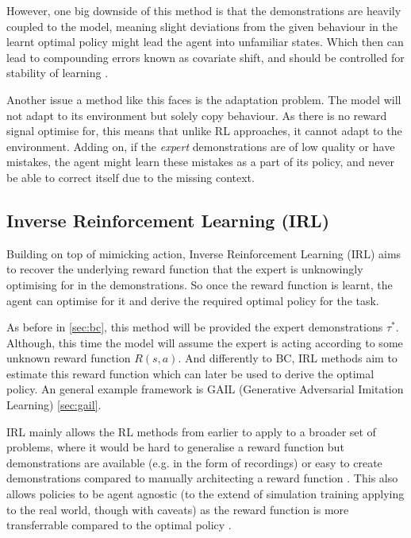  However, one big downside of this method is that the demonstrations are heavily coupled to the model, meaning slight deviations from the given behaviour in the learnt optimal policy might lead the agent into unfamiliar states. Which then can lead to compounding errors known as covariate shift, and should be controlled for stability of learning \cite{mehta2024stablebccontrollingcovariateshift}. 
 \label{para:covariate-shift}
 
 Another issue a method like this faces is the adaptation problem. The model will not adapt to its environment but solely copy behaviour. As there is no reward signal optimise for, this means that unlike RL approaches, it cannot adapt to the environment. Adding on, if the \emph{expert} demonstrations are of low quality or have mistakes, the agent might learn these mistakes as a part of its policy, and never be able to correct itself due to the missing context.


\subsection{Inverse Reinforcement Learning (IRL)}
Building on top of mimicking action, Inverse Reinforcement Learning (IRL) aims to recover the underlying reward function that the expert is unknowingly optimising for in the demonstrations. So once the reward function is learnt, the agent can optimise for it and derive the required optimal policy for the task.

 
As before in \ref{sec:bc}, this method will be provided the expert demonstrations $\tau^*$. Although, this time the model will assume the expert is acting according to some unknown reward function $R\left(s, a\right)$. And differently to BC, IRL methods aim to estimate this reward function which can later be used to derive the optimal policy. An general example framework is GAIL (Generative Adversarial Imitation Learning) \ref{sec:gail}.

IRL mainly allows the RL methods from earlier to apply to a broader set of problems, where it would be hard to generalise a reward function but demonstrations are available (e.g. in the form of recordings) or easy to create demonstrations compared to manually architecting a reward function \cite{ARORA2021103500}. This also allows policies to be agent agnostic (to the extend of simulation training applying to the real world, though with caveats) as the reward function is more transferrable compared to the optimal policy \cite{russell1998learning}.

